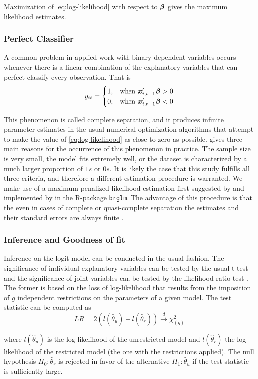 Maximization of \ref{eq:log-likelihood} with respect to $\bm \beta$ gives the maximum likelihood estimates. 

\subsubsection{Perfect Classifier}

A common problem in applied work with binary dependent variables occurs whenever there is a linear combination of the explanatory variables that can perfect classify every observation. That is
\begin{equation}
y_{it} = \begin{cases} 
      1, & \text{when } \bm x'_{i,t-1}\bm \beta > 0 \\
      0, & \text{when } \bm x'_{i,t-1}\bm \beta < 0 
   \end{cases}
\end{equation}

This phenomenon is called complete separation, and it produces infinite parameter estimates in the usual numerical optimization algorithms that attempt to make the value of \ref{eq:log-likelihood} as close to zero as possible. \citet{davidson2004} gives three main reasons for the occurrence of this phenomenon in practice. The sample size is very small, the model fits extremely well, or the dataset is characterized by a much larger proportion of $1s$ or $0s$. It is likely the case that this study fulfills all three criteria, and therefore a different estimation procedure is warranted. We make use of a maximum penalized likelihood estimation first suggested by \citet{firth1993} and implemented by \citet{brglm} in the R-package \texttt{brglm}. The advantage of this procedure is that the even in cases of complete or quasi-complete separation the estimates and their standard errors are always finite \citep{brglm}.

\subsubsection{Inference and Goodness of fit}

Inference on the logit model can be conducted in the usual fashion. The significance of individual explanatory variables can be tested by the usual t-test and the significance of joint variables can be tested by the likelihood ratio test \citep[p. 453]{heij2004}. The former is based on the loss of log-likelihood that results from the imposition of $g$ independent restrictions on the parameters of a given model. The test statistic can be computed as
\begin{equation*}
LR = 2(l(\hat{\theta}_u) - l(\hat{\theta}_r)) \xrightarrow{d}\chi^2_{(g)}
\end{equation*}

where $l(\hat{\theta}_u)$ is the log-likelihood of the unrestricted model and $l(\hat{\theta}_r)$ the log-likelihood of the restricted model (the one with the restrictions applied). The null hypothesis $H_0: \hat{\theta}_r$ is rejected in favor of the alternative $H_1: \hat{\theta}_u$ if the test statistic is sufficiently large.




